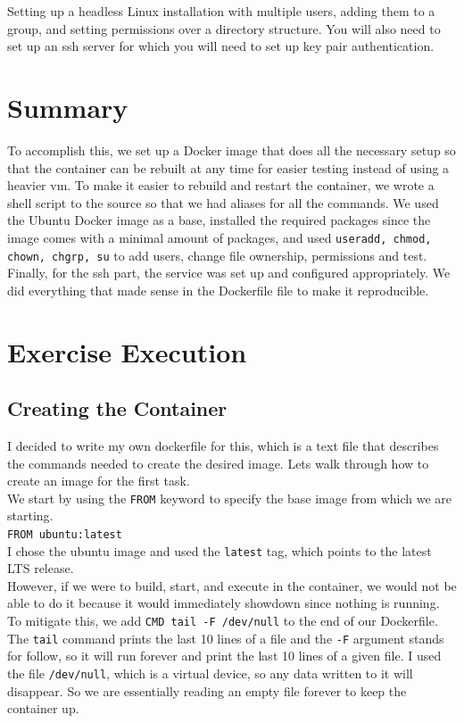 \documentclass[a4paper]{article}
\begin{document}
Setting up a headless Linux installation with multiple users, adding them to a group, and setting permissions over a directory structure. You will also need to set up an ssh server for which you will need to set up key pair authentication.


\section{Summary}

To accomplish this, we set up a Docker image that does all the necessary setup so that the container can be rebuilt at any time for easier testing instead of using a heavier vm. To make it easier to rebuild and restart the container, we wrote a shell script to the source so that we had aliases for all the commands. We used the Ubuntu Docker image as a base, installed the required packages since the image comes with a minimal amount of packages, and used \texttt{useradd, chmod, chown, chgrp, su} to add users, change file ownership, permissions and test. Finally, for the ssh part, the service was set up and configured appropriately. We did everything that made sense in the Dockerfile file to make it reproducible. 


\newpage

\section{Exercise Execution}

\subsection{Creating the Container}

I decided to write my own dockerfile for this, which is a text file that describes the commands needed to create the desired image. Lets walk through how to create an image for the first task. \\
We start by using the \texttt{FROM} keyword to specify the base image \cite{docker-glossary} from which we are starting.
\\
\texttt{FROM ubuntu:latest} \\
I chose the ubuntu image \cite{ubuntu} and used the \texttt{latest} tag, which points to the latest LTS release.\\
However, if we were to build, start, and execute in the container, we would not be able to do it because it would immediately showdown since nothing is running. \\
To mitigate this, we add \texttt{CMD tail -F /dev/null} to the end of our Dockerfile. The \texttt{tail} command prints the last 10 lines of a file and the \texttt{-F} argument stands for follow, so it will run forever and print the last 10 lines of a given file.\cite{tail} I used the file \texttt{/dev/null}, which is a virtual device, so any data written to it will disappear. \cite{devnull} So we are essentially reading an empty file forever to keep the container up. \\
\end{document}
